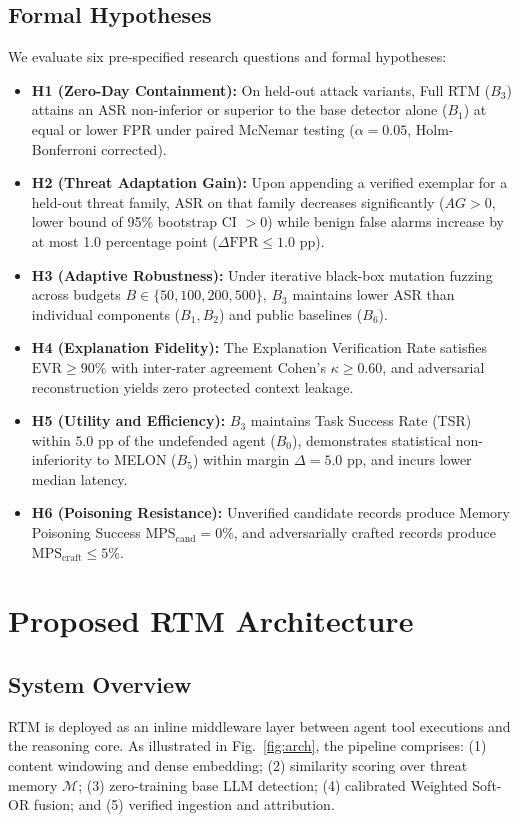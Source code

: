 \documentclass[conference]{IEEEtran}
\begin{document}
\subsection{Formal Hypotheses}
We evaluate six pre-specified research questions and formal hypotheses:
\begin{itemize}
    \item \textbf{H1 (Zero-Day Containment):} On held-out attack variants, Full RTM ($B_3$) attains an ASR non-inferior or superior to the base detector alone ($B_1$) at equal or lower FPR under paired McNemar testing ($\alpha = 0.05$, Holm-Bonferroni corrected).
    \item \textbf{H2 (Threat Adaptation Gain):} Upon appending a verified exemplar for a held-out threat family, ASR on that family decreases significantly ($AG > 0$, lower bound of 95\% bootstrap CI $> 0$) while benign false alarms increase by at most 1.0 percentage point ($\Delta\text{FPR} \le 1.0\text{ pp}$).
    \item \textbf{H3 (Adaptive Robustness):} Under iterative black-box mutation fuzzing across budgets $B \in \{50, 100, 200, 500\}$, $B_3$ maintains lower ASR than individual components ($B_1, B_2$) and public baselines ($B_6$).
    \item \textbf{H4 (Explanation Fidelity):} The Explanation Verification Rate satisfies $\text{EVR} \ge 90\%$ with inter-rater agreement Cohen's $\kappa \ge 0.60$, and adversarial reconstruction yields zero protected context leakage.
    \item \textbf{H5 (Utility and Efficiency):} $B_3$ maintains Task Success Rate (TSR) within $5.0\text{ pp}$ of the undefended agent ($B_0$), demonstrates statistical non-inferiority to MELON ($B_5$) within margin $\Delta = 5.0\text{ pp}$, and incurs lower median latency.
    \item \textbf{H6 (Poisoning Resistance):} Unverified candidate records produce Memory Poisoning Success $\text{MPS}_{\text{cand}} = 0\%$, and adversarially crafted records produce $\text{MPS}_{\text{craft}} \le 5\%$.
\end{itemize}

\section{Proposed RTM Architecture}
\subsection{System Overview}
RTM is deployed as an inline middleware layer between agent tool executions and the reasoning core. As illustrated in Fig.~\ref{fig:arch}, the pipeline comprises: (1) content windowing and dense embedding; (2) similarity scoring over threat memory $\mathcal{M}$; (3) zero-training base LLM detection; (4) calibrated Weighted Soft-OR fusion; and (5) verified ingestion and attribution.
\end{document}
